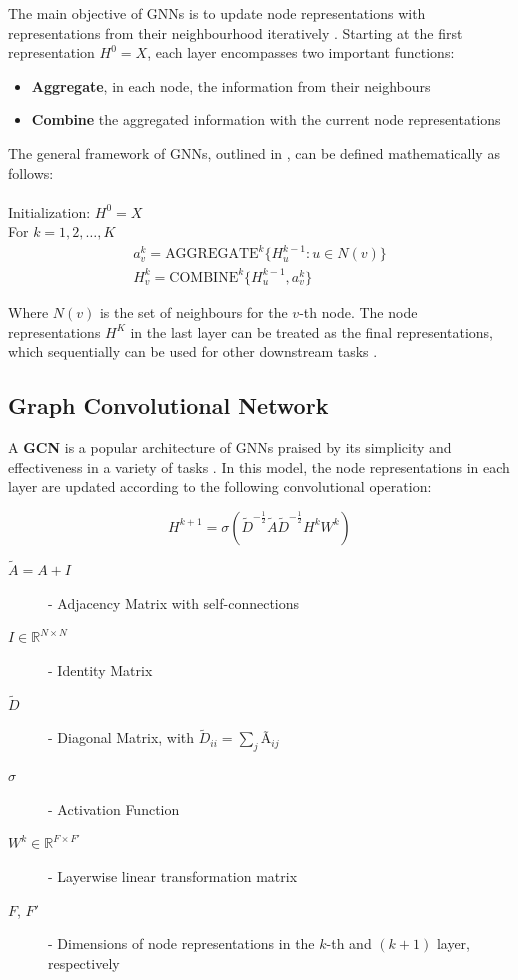 The main objective of \acp{GNN} is to update node representations with representations from their neighbourhood iteratively \cite{tangGraphNeuralNetworks2022}. Starting at the first representation $H^0 = X$, each layer encompasses two important functions:
\begin{itemize}
	\item \textbf{Aggregate}, in each node, the information from their neighbours
	\item \textbf{Combine} the aggregated information with the current node representations
\end{itemize}

The general framework of \acp{GNN}, outlined in \cite{tangGraphNeuralNetworks2022}, can be defined mathematically as follows: \\ \\
Initialization: $H^0 = X$ \\
For $k = 1, 2, \dots, K$
\begin{gather*}
	a^k_v = \text{AGGREGATE}^k\{H^{k-1}_u : u \in N(v)\} \\
	H^k_v = \text{COMBINE}^k\{H^{k-1}_u, a^k_v\}       
\end{gather*}

Where $N(v)$ is the set of neighbours for the $v$-th node. The node representations $H^K$ in the last layer can be treated as the final representations, which sequentially can be used for other downstream tasks \cite{tangGraphNeuralNetworks2022}.


\subsection{Graph Convolutional Network}

A \textbf{\acf{GCN}} \cite{kipfSemiSupervisedClassificationGraph2017} is a popular architecture of \acp{GNN} praised by its simplicity and effectiveness in a variety of tasks \cite{liuIntroductionGraphNeural2020, tangGraphNeuralNetworks2022}. In this model, the node representations in each layer are updated according to the following convolutional operation:

\begin{equation} \label{eq:graph-convolution}
	H^{k+1} = \sigma(\tilde{D}^{-\frac{1}{2}} \tilde{A} \tilde{D}^{-\frac{1}{2}} H^k W^k)  
\end{equation}

\begin{description}
	\item[$\tilde{A} = A + I$] - Adjacency Matrix with self-connections 
	\item[$I \in \mathbb{R}^{N \times N}$] - Identity Matrix 
	\item[$\tilde{D}$] - Diagonal Matrix,  with $\tilde{D}_{ii} = \sum_j Ã_{ij}$ 
	\item[$\sigma$] - Activation Function 
	\item[$W^k \in \mathbb{R}^{F \times F'}$] - Layerwise linear transformation matrix 
	\item[$F$, $F'$] - Dimensions of node representations in the $k$-th and $(k + 1)$ layer, respectively
\end{description}


